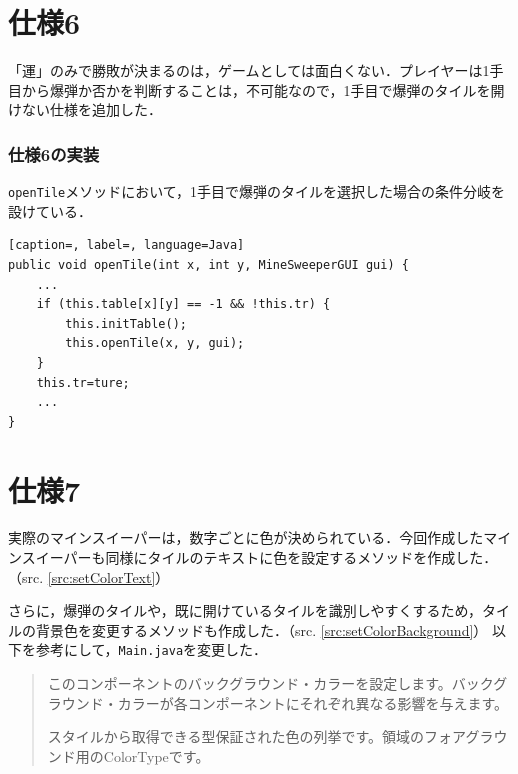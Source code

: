 \documentclass[a4j,11pt]{jsarticle}
\newcommand{\srcref}[1]{src. \ref{#1}}
\begin{document}
\section*{仕様6}
\setcounter{section}{6}
\setcounter{subsection}{0}
「運」のみで勝敗が決まるのは，ゲームとしては面白くない．プレイヤーは1手目から爆弾か否かを判断することは，不可能なので，1手目で爆弾のタイルを開けない仕様を追加した．
\subsubsection*{仕様6の実装}
\verb|openTile|メソッドにおいて，1手目で爆弾のタイルを選択した場合の条件分岐を設けている．
\begin{lstlisting}[caption=, label=, language=Java]
public void openTile(int x, int y, MineSweeperGUI gui) {
    ...
    if (this.table[x][y] == -1 && !this.tr) {
        this.initTable();
        this.openTile(x, y, gui);
    }
    this.tr=ture;
    ...
}
\end{lstlisting}
\section*{仕様7}
\setcounter{section}{7}
\setcounter{subsection}{0}
実際のマインスイーパーは，数字ごとに色が決められている．今回作成したマインスイーパーも同様にタイルのテキストに色を設定するメソッドを作成した．（\srcref{src:setColorText}）\par
さらに，爆弾のタイルや，既に開けているタイルを識別しやすくするため，タイルの背景色を変更するメソッドも作成した．（\srcref{src:setColorBackground}）
以下を参考にして，\verb|Main.java|を変更した．
\begin{quotation}
    このコンポーネントのバックグラウンド・カラーを設定します。バックグラウンド・カラーが各コンポーネントにそれぞれ異なる影響を与えます。\hfill{\cite{label3}}\par
    スタイルから取得できる型保証された色の列挙です。領域のフォアグラウンド用のColorTypeです。\hfill{\cite{label4}}
\end{quotation}
\end{document}
